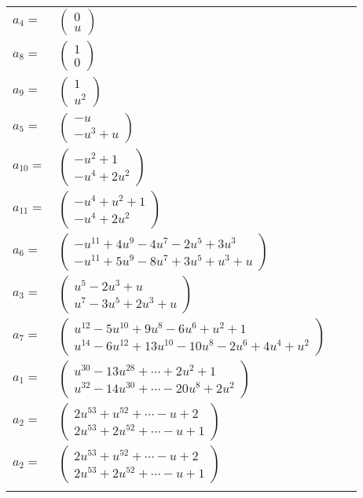 \documentclass[1p]{elsarticle_modified}
\theoremstyle{definition}
\begin{document}
\begin{tabular}{m{7pt} m{180pt} m{7pt} m{180pt} }
\flushright $a_{4}=$&$\begin{pmatrix}0\\u\end{pmatrix}$ \\
\flushright $a_{8}=$&$\begin{pmatrix}1\\0\end{pmatrix}$ \\
\flushright $a_{9}=$&$\begin{pmatrix}1\\u^2\end{pmatrix}$ \\
\flushright $a_{5}=$&$\begin{pmatrix}- u\\- u^3+u\end{pmatrix}$ \\
\flushright $a_{10}=$&$\begin{pmatrix}- u^2+1\\- u^4+2 u^2\end{pmatrix}$ \\
\flushright $a_{11}=$&$\begin{pmatrix}- u^4+u^2+1\\- u^4+2 u^2\end{pmatrix}$ \\
\flushright $a_{6}=$&$\begin{pmatrix}- u^{11}+4 u^9-4 u^7-2 u^5+3 u^3\\- u^{11}+5 u^9-8 u^7+3 u^5+u^3+u\end{pmatrix}$ \\
\flushright $a_{3}=$&$\begin{pmatrix}u^5-2 u^3+u\\u^7-3 u^5+2 u^3+u\end{pmatrix}$ \\
\flushright $a_{7}=$&$\begin{pmatrix}u^{12}-5 u^{10}+9 u^8-6 u^6+u^2+1\\u^{14}-6 u^{12}+13 u^{10}-10 u^8-2 u^6+4 u^4+u^2\end{pmatrix}$ \\
\flushright $a_{1}=$&$\begin{pmatrix}u^{30}-13 u^{28}+\cdots+2 u^2+1\\u^{32}-14 u^{30}+\cdots-20 u^8+2 u^2\end{pmatrix}$ \\
\flushright $a_{2}=$&$\begin{pmatrix}2 u^{53}+u^{52}+\cdots- u+2\\2 u^{53}+2 u^{52}+\cdots- u+1\end{pmatrix}$\\ \flushright $a_{2}=$&$\begin{pmatrix}2 u^{53}+u^{52}+\cdots- u+2\\2 u^{53}+2 u^{52}+\cdots- u+1\end{pmatrix}$\\&\end{tabular}
\end{document}
